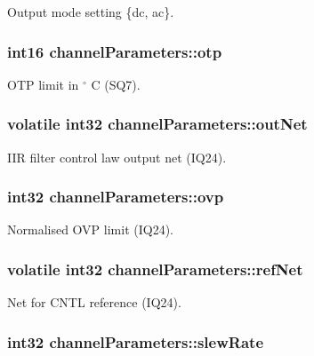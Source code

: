 Output mode setting \{dc, ac\}. \hypertarget{a00003_a9df39dee6c165c882bb04e26b17e3e25}{
\subsubsection[{otp}]{\setlength{\rightskip}{0pt plus 5cm}int16 channel\-Parameters\-::otp}}\label{a00003_a9df39dee6c165c882bb04e26b17e3e25}
O\-T\-P limit in $ ^\circ$ C (S\-Q7). \hypertarget{a00003_ae9a6e93b8f7d8554dd06269339167215}{
\subsubsection[{out\-Net}]{\setlength{\rightskip}{0pt plus 5cm}volatile int32 channel\-Parameters\-::out\-Net}}\label{a00003_ae9a6e93b8f7d8554dd06269339167215}
I\-I\-R filter control law output net (I\-Q24). \hypertarget{a00003_aefb9a7e765e361d08e0ae0bbc352e244}{
\subsubsection[{ovp}]{\setlength{\rightskip}{0pt plus 5cm}int32 channel\-Parameters\-::ovp}}\label{a00003_aefb9a7e765e361d08e0ae0bbc352e244}
Normalised O\-V\-P limit (I\-Q24). \hypertarget{a00003_a8e3dbb10da7b72b7b4fe6c200fbb495c}{
\subsubsection[{ref\-Net}]{\setlength{\rightskip}{0pt plus 5cm}volatile int32 channel\-Parameters\-::ref\-Net}}\label{a00003_a8e3dbb10da7b72b7b4fe6c200fbb495c}
Net for C\-N\-T\-L reference (I\-Q24). \hypertarget{a00003_a09eb121ecb75a652f7689869d1685a30}{
\subsubsection[{slew\-Rate}]{\setlength{\rightskip}{0pt plus 5cm}int32 channel\-Parameters\-::slew\-Rate}}\label{a00003_a09eb121ecb75a652f7689869d1685a30}
